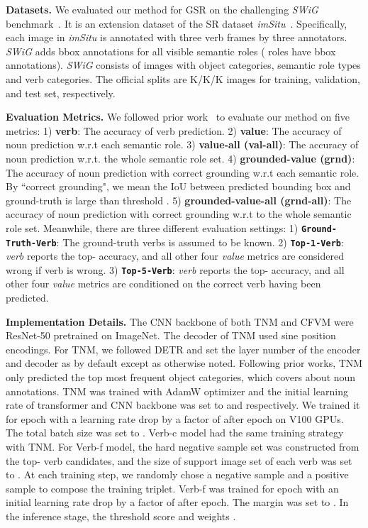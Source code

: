 \documentclass[letterpaper]{article} \usepackage{aaai22}  \usepackage{times}  \usepackage{helvet}  \usepackage{courier}  \usepackage[hyphens]{url}  \usepackage{graphicx} \urlstyle{rm} \def\UrlFont{\rm}  \usepackage{natbib}  \usepackage{caption} \DeclareCaptionStyle{ruled}{labelfont=normalfont,labelsep=colon,strut=off} \frenchspacing  \setlength{\pdfpagewidth}{8.5in}  \setlength{\pdfpageheight}{11in}
\begin{document}
\noindent \textbf{Datasets.}
We evaluated our method for GSR on the challenging \textit{SWiG} benchmark~\cite{pratt2020grounded}. It is an extension dataset of the SR dataset \textit{imSitu}~\cite{yatskar2016situation}. Specifically, each image in \textit{imSitu} is annotated with three verb frames by three annotators. \textit{SWiG} adds bbox annotations for all visible semantic roles ( roles have bbox annotations). \textit{SWiG} consists of  images with  object categories,  semantic role types and  verb categories. The official splits are K/K/K images for training, validation, and test set, respectively. 

\noindent \textbf{Evaluation Metrics.}
We followed prior work~\cite{pratt2020grounded} to evaluate our method on five metrics: 1) \textbf{verb}: The accuracy of verb prediction. 2) \textbf{value}: The accuracy of noun prediction w.r.t each semantic role. 3) \textbf{value-all (val-all)}: The accuracy of noun prediction w.r.t. the whole semantic role set. 4) \textbf{grounded-value (grnd)}: The accuracy of noun prediction with correct grounding w.r.t each semantic role. By ``correct grounding", we mean the IoU between predicted bounding box and ground-truth is large than threshold . 5) \textbf{grounded-value-all (grnd-all)}: The accuracy of noun prediction with correct grounding w.r.t to the whole semantic role set. Meanwhile, there are three different evaluation settings: 1) \textbf{\texttt{Ground-Truth-Verb}}: The ground-truth verbs is assumed to be known. 2) \textbf{\texttt{Top-1-Verb}}: \emph{verb} reports the top- accuracy, and all other four \emph{value} metrics are considered wrong if verb is wrong. 3) \textbf{\texttt{Top-5-Verb}}: \emph{verb} reports the top- accuracy, and all other four \emph{value} metrics are conditioned on the correct verb having been predicted.




\noindent \textbf{Implementation Details.}
The CNN backbone of both TNM and CFVM were ResNet-50 pretrained on ImageNet. The decoder of TNM used sine position encodings. For TNM, we followed DETR and set the layer number of the encoder and decoder as  by default except as otherwise noted. Following prior works, TNM only predicted the top  most frequent object categories, which covers about  noun annotations. TNM was trained with AdamW optimizer and the initial learning rate of transformer and CNN backbone was set to  and  respectively. We trained it for  epoch with a learning rate drop by a factor of  after  epoch on  V100 GPUs. The total batch size was set to . Verb-c model had the same training strategy with TNM. For Verb-f model, the hard negative sample set was constructed from the top- verb candidates, and the size of support image set of each verb was set to .
At each training step, we randomly chose a negative sample and a positive sample to compose the training triplet. Verb-f was trained for  epoch with an initial learning rate  drop by a factor of  after  epoch. The margin  was set to . In the inference stage, the threshold score  and weights .  
\end{document}
